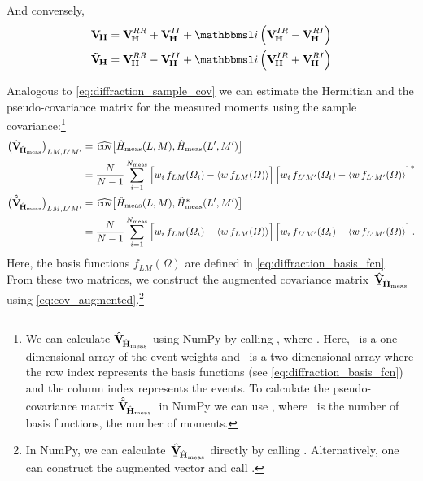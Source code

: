 And conversely,
\begin{align}
  \covMatSym_{\!\vect{H}}
  = \covMatSym_{\!\vect{H}}^{RR} + \covMatSym_{\!\vect{H}}^{II} + \imag \rBrk{\covMatSym_{\!\vect{H}}^{IR} - \covMatSym_{\!\vect{H}}^{RI}}
  \\
  \tilde{\covMatSym}_{\!\vect{H}}
  = \covMatSym_{\!\vect{H}}^{RR} - \covMatSym_{\!\vect{H}}^{II} + \imag \rBrk{\covMatSym_{\!\vect{H}}^{IR} + \covMatSym_{\!\vect{H}}^{RI}}
\end{align}

Analogous to \cref{eq:diffraction_sample_cov} we can estimate the
Hermitian and the pseudo-covariance matrix for the measured moments
using the sample covariance:\footnote{We can calculate
$\hat{\bm{\mathrm{V}}}_{\!\hat{\bm{\mathrm{H}}}_\text{meas}}$ using NumPy by calling
, where .  Here, ~is a one-dimensional array of the event
weights and ~is a two-dimensional array where the row
index represents the basis functions (see
\cref{eq:diffraction_basis_fcn}) and the column index represents the
events.  To calculate the pseudo-covariance matrix
$\hat{\tilde{\bm{\mathrm{V}}}}_{\!\hat{\bm{\mathrm{H}}}_\text{meas}}$~in NumPy we
can use , where ~is the number
of basis functions, \ie the number of moments.}
\begin{align}
  \rBrk[1]{\covMatEstSym_{\!\hat{\vect{H}}_\text{meas}}}_{L M, L' M'}
  ={}& \covEst[1]{\hat{H}_\text{meas}(L, M), \hat{H}_\text{meas}(L', M')} \nonumber
  \\
  \label{eq:diffraction_sample_cov_hermit_meas}
  ={}& \frac{N}{N - 1} \sum_{i = 1}^{N_\text{meas}}
  \sBrk[2]{w_i\, f_{L M}(\Omega_i) - \mean{w\, f_{L M}(\Omega)}} \sBrk[2]{w_i\, f_{L' M'}(\Omega_i) - \mean{w\, f_{L' M'}(\Omega)}}^*
  \\
  \rBrk[1]{\hat{\tilde{\covMatSym}}_{\!\hat{\vect{H}}_\text{meas}}}_{L M, L' M'}
  ={}& \covEst[1]{\hat{H}_\text{meas}(L, M), \hat{H}_\text{meas}^*(L', M')} \nonumber
  \\
  \label{eq:diffraction_sample_cov_pseudo_meas}
  ={}& \frac{N}{N - 1} \sum_{i = 1}^{N_\text{meas}}
  \sBrk[2]{w_i\, f_{L M}(\Omega_i) - \mean{w\, f_{L M}(\Omega)}} \sBrk[2]{w_i\, f_{L' M'}(\Omega_i) - \mean{w\, f_{L' M'}(\Omega)}}.
\end{align}
Here, the basis functions $f_{L M}(\Omega)$ are defined in
\cref{eq:diffraction_basis_fcn}.  From these two matrices, we
construct the augmented covariance
matrix~$\hat{\underaccent{\bar}{\covMatSym}}_{\!\hat{\vect{H}}_\text{meas}}$
using \cref{eq:cov_augmented}.\footnote{\label{fn:cov_aug_numpy}In
NumPy, we can
calculate~$\hat{\underaccent{\bar}{\covMatSym}}_{\!\hat{\vect{H}}_\text{meas}}$
directly by calling .  Alternatively, one can construct the
augmented vector  and call .}

